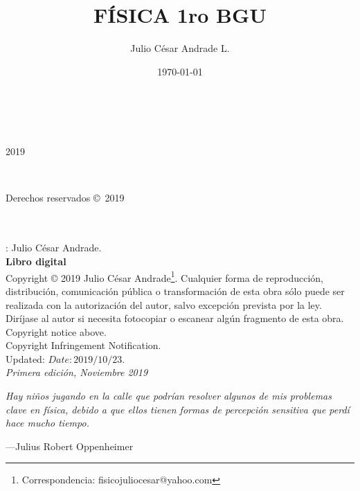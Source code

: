 \documentclass[a5paper,pagesize,10pt,bibtotoc,pointlessnumbers,
normalheadings,DIV=9,fleqn,x11names,table,twoside=false]{scrbook}
\title{FÍSICA 1ro BGU}
\author{Julio César Andrade L.}
\date{\today}
\begin{document}
%

\begin{titlepage}
		\\
			
		\vspace{10mm}
		\\
		\vspace{\fill}
		\centering \large{2019}
\end{titlepage}


\newpage
~\vfill
\thispagestyle{empty}

\noindent 
\parbox[s]{0.35\textwidth}{Derechos reservados \copyright\ 2019}\parbox[c]{0.65\textwidth}{
 \color{gray}
 } \\\\  
 
: Julio César Andrade.\\
\noindent \textbf{Libro digital}\\

\noindent  Copyright © 2019 Julio César Andrade\footnote{Correspondencia: fisicojuliocesar@yahoo.com}. 
Cualquier forma de reproducción, distribución, comunicación pública o transformación de esta obra sólo puede ser realizada con  la 
 autorización  del autor,  salvo  excepción  prevista  por  la  ley.  Diríjase  al autor si  necesita  fotocopiar  o  escanear 
algún fragmento de esta obra.\\

Copyright notice above.\\

Copyright Infringement Notification.\\

Updated: $Date: 2019/10/23$.\\

\noindent \textit{Primera edición, Noviembre 2019} 


\newpage{}
\thispagestyle {empty}

\vspace*{2cm}

\begin{center}
	\Large{\parbox{10cm}{
		\begin{raggedright}
		{\Large 
			\textit{Hay niños jugando en la calle que podrían resolver algunos de mis problemas clave en física, 
			debido a que ellos tienen formas de percepción sensitiva que perdí hace mucho tiempo.}
		}
	
		\vspace{.5cm}\hfill{---Julius Robert Oppenheimer}
		\end{raggedright}
	}
}
\end{center}
\end{document}
